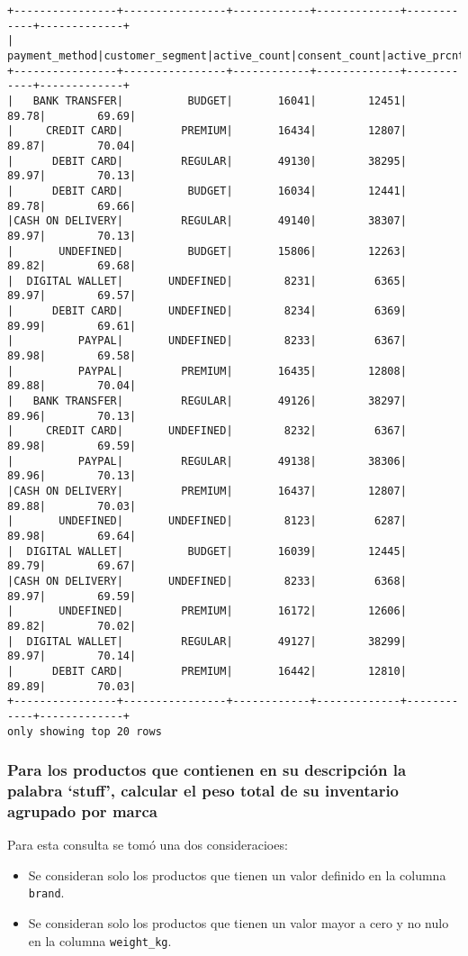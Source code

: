 \begin{lstlisting}[style=console, caption=Resultados de la consulta 3 propuesta por el enunciado, label={lst:enunciado_q3_results}, xleftmargin=0pt, xrightmargin=0pt]
+----------------+----------------+------------+-------------+------------+-------------+
|  payment_method|customer_segment|active_count|consent_count|active_prcnt|consent_prcnt|
+----------------+----------------+------------+-------------+------------+-------------+
|   BANK TRANSFER|          BUDGET|       16041|        12451|       89.78|        69.69|
|     CREDIT CARD|         PREMIUM|       16434|        12807|       89.87|        70.04|
|      DEBIT CARD|         REGULAR|       49130|        38295|       89.97|        70.13|
|      DEBIT CARD|          BUDGET|       16034|        12441|       89.78|        69.66|
|CASH ON DELIVERY|         REGULAR|       49140|        38307|       89.97|        70.13|
|       UNDEFINED|          BUDGET|       15806|        12263|       89.82|        69.68|
|  DIGITAL WALLET|       UNDEFINED|        8231|         6365|       89.97|        69.57|
|      DEBIT CARD|       UNDEFINED|        8234|         6369|       89.99|        69.61|
|          PAYPAL|       UNDEFINED|        8233|         6367|       89.98|        69.58|
|          PAYPAL|         PREMIUM|       16435|        12808|       89.88|        70.04|
|   BANK TRANSFER|         REGULAR|       49126|        38297|       89.96|        70.13|
|     CREDIT CARD|       UNDEFINED|        8232|         6367|       89.98|        69.59|
|          PAYPAL|         REGULAR|       49138|        38306|       89.96|        70.13|
|CASH ON DELIVERY|         PREMIUM|       16437|        12807|       89.88|        70.03|
|       UNDEFINED|       UNDEFINED|        8123|         6287|       89.98|        69.64|
|  DIGITAL WALLET|          BUDGET|       16039|        12445|       89.79|        69.67|
|CASH ON DELIVERY|       UNDEFINED|        8233|         6368|       89.97|        69.59|
|       UNDEFINED|         PREMIUM|       16172|        12606|       89.82|        70.02|
|  DIGITAL WALLET|         REGULAR|       49127|        38299|       89.97|        70.14|
|      DEBIT CARD|         PREMIUM|       16442|        12810|       89.89|        70.03|
+----------------+----------------+------------+-------------+------------+-------------+
only showing top 20 rows
\end{lstlisting}


\subsubsection{Para los productos que contienen en su descripción la palabra `stuff', calcular el peso total de su inventario agrupado por marca}
Para esta consulta se tomó una dos consideracioes:
\begin{itemize}
    \item Se consideran solo los productos que tienen un valor definido en la columna \texttt{brand}.
    \item Se consideran solo los productos que tienen un valor mayor a cero y no nulo en la columna \texttt{weight\_kg}.
\end{itemize}

